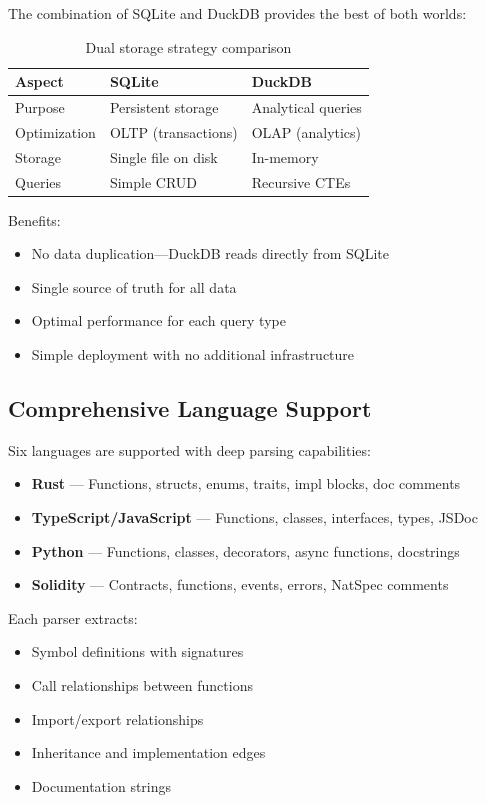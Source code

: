 The combination of SQLite and DuckDB provides the best of both worlds:

\begin{table}[h]
\centering
\begin{tabular}{lll}
\toprule
\textbf{Aspect} & \textbf{SQLite} & \textbf{DuckDB} \\
\midrule
Purpose & Persistent storage & Analytical queries \\
Optimization & OLTP (transactions) & OLAP (analytics) \\
Storage & Single file on disk & In-memory \\
Queries & Simple CRUD & Recursive CTEs \\
\bottomrule
\end{tabular}
\caption{Dual storage strategy comparison}
\label{tab:storage-comparison}
\end{table}

Benefits:
\begin{itemize}
    \item No data duplication---DuckDB reads directly from SQLite
    \item Single source of truth for all data
    \item Optimal performance for each query type
    \item Simple deployment with no additional infrastructure
\end{itemize}

\subsection{Comprehensive Language Support}

Six languages are supported with deep parsing capabilities:

\begin{itemize}
    \item \textbf{Rust} --- Functions, structs, enums, traits, impl blocks, doc comments
    \item \textbf{TypeScript/JavaScript} --- Functions, classes, interfaces, types, JSDoc
    \item \textbf{Python} --- Functions, classes, decorators, async functions, docstrings
    \item \textbf{Solidity} --- Contracts, functions, events, errors, NatSpec comments
\end{itemize}

Each parser extracts:
\begin{itemize}
    \item Symbol definitions with signatures
    \item Call relationships between functions
    \item Import/export relationships
    \item Inheritance and implementation edges
    \item Documentation strings
\end{itemize}

